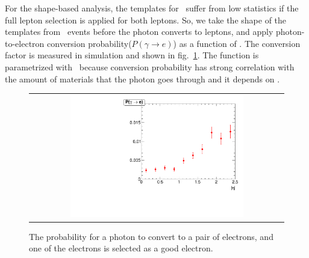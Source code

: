 For the shape-based analysis, the templates for \wgamma\ suffer from low statistics 
if the full lepton selection is applied for both leptons. So, we take the shape of the 
templates from \wgamma\ events before the photon converts to leptons, and apply 
photon-to-electron conversion probability($P(\gamma \rightarrow e)$) as a function of \Eta. 
The conversion 
factor is measured in simulation and shown in fig.~\ref{fig:photon_electron_ratio}.  
The function is parametrized with \Eta\ because conversion probability has strong 
correlation with the amount of materials that the photon goes through
and it depends on \Eta. 
\begin{figure}[htp] 
\centering 
\begin{tabular}{c} 
\includegraphics[width=0.7\textwidth]{figures/ratio_photon_electron.pdf} 
\end{tabular} 
\caption{The probability for a photon to convert to a pair of electrons, 
and one of the electrons is selected as a good electron.  } 
\label{fig:photon_electron_ratio} 
\end{figure}  

